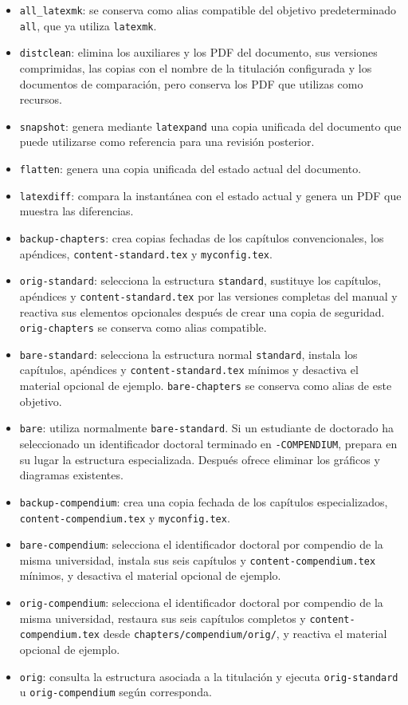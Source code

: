 \begin{itemize}
  \item \texttt{all\_latexmk}: se conserva como alias compatible del objetivo predeterminado \texttt{all}, que ya utiliza \texttt{latexmk}.
  \item \texttt{distclean}: elimina los auxiliares y los PDF del documento, sus versiones comprimidas, las copias con el nombre de la titulación configurada y los documentos de comparación, pero conserva los PDF que utilizas como recursos.
  \item \texttt{snapshot}: genera mediante \texttt{latexpand} una copia unificada del documento que puede utilizarse como referencia para una revisión posterior.
  \item \texttt{flatten}: genera una copia unificada del estado actual del documento.
  \item \texttt{latexdiff}: compara la instantánea con el estado actual y genera un PDF que muestra las diferencias.
  \item \texttt{backup-chapters}: crea copias fechadas de los capítulos convencionales, los apéndices, \texttt{content-standard.tex} y \texttt{myconfig.tex}.
  \item \texttt{orig-standard}: selecciona la estructura \texttt{standard}, sustituye los capítulos, apéndices y \texttt{content-standard.tex} por las versiones completas del manual y reactiva sus elementos opcionales después de crear una copia de seguridad. \texttt{orig-chapters} se conserva como alias compatible.
  \item \texttt{bare-standard}: selecciona la estructura normal \texttt{standard}, instala los capítulos, apéndices y \texttt{content-standard.tex} mínimos y desactiva el material opcional de ejemplo. \texttt{bare-chapters} se conserva como alias de este objetivo.
  \item \texttt{bare}: utiliza normalmente \texttt{bare-standard}. Si un estudiante de doctorado ha seleccionado un identificador doctoral terminado en \texttt{-COMPENDIUM}, prepara en su lugar la estructura especializada. Después ofrece eliminar los gráficos y diagramas existentes.
  \item \texttt{backup-compendium}: crea una copia fechada de los capítulos especializados, \texttt{content-compendium.tex} y \texttt{myconfig.tex}.
  \item \texttt{bare-compendium}: selecciona el identificador doctoral por compendio de la misma universidad, instala sus seis capítulos y \texttt{content-compendium.tex} mínimos, y desactiva el material opcional de ejemplo.
  \item \texttt{orig-compendium}: selecciona el identificador doctoral por compendio de la misma universidad, restaura sus seis capítulos completos y \texttt{content-compendium.tex} desde \texttt{chapters/compendium/orig/}, y reactiva el material opcional de ejemplo.
  \item \texttt{orig}: consulta la estructura asociada a la titulación y ejecuta \texttt{orig-standard} u \texttt{orig-compendium} según corresponda.
\end{itemize}

